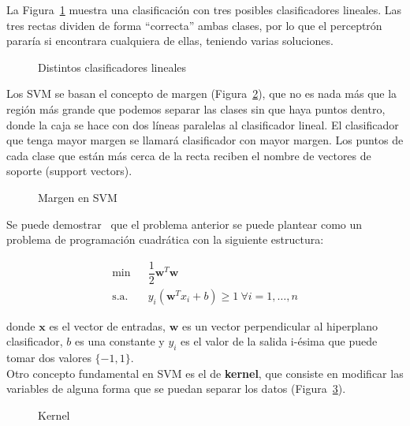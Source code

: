 La Figura~\ref{fig:clasificador} muestra una clasificación con tres posibles clasificadores lineales. Las tres rectas dividen de forma ``correcta'' ambas clases, por lo que el perceptrón pararía si encontrara cualquiera de ellas, teniendo varias soluciones.\\

\begin{figure}[htbp!]
	\centering
	\clasificador
	\caption{Distintos clasificadores lineales}
	\label{fig:clasificador}
\end{figure}

Los SVM se basan el concepto de margen (Figura~\ref{fig:margen}), que no es nada más que la región más grande que podemos separar las clases sin que haya puntos dentro, donde la caja se hace con dos líneas paralelas al clasificador lineal. El clasificador que tenga mayor margen se llamará clasificador con mayor margen. Los puntos de cada clase que están más cerca de la recta reciben el nombre de vectores de soporte (support vectors).\\

 \begin{figure}[htbp!]
	\centering
	\margen
 	\caption{Margen en SVM}
 	\label{fig:margen}
 \end{figure} 
 
 Se puede demostrar~\cite{Bishop:2006:PRM:1162264,Marsland:2009:MLA:1571643} que el problema anterior se puede plantear como un problema de programación cuadrática con la siguiente estructura:
 
 \begin{align}
 \min & \ \ \ \dfrac{1}{2}\mathbf{w}^T \mathbf{w}\\
 \text{s.a. } & \ \ \ y_i (\mathbf{w}^T x_i + b) \geq 1 \ \forall i = 1,\dots, n
 \end{align}
 
 donde $\mathbf{x}$ es el vector de entradas, $\mathbf{w}$ es un vector perpendicular al hiperplano clasificador, $b$ es una constante y $y_i$ es el valor de la salida i-ésima que puede  tomar dos valores $\{-1,1\}$.\\
 
 Otro concepto fundamental en SVM es el de \textbf{kernel}, que consiste en modificar las variables de alguna forma que se puedan separar los datos (Figura~\ref{fig:kernel}).\\
 
\begin{figure}[htbp!]
	\centering
	\caption{Kernel}
	\label{fig:kernel}
\end{figure} 


